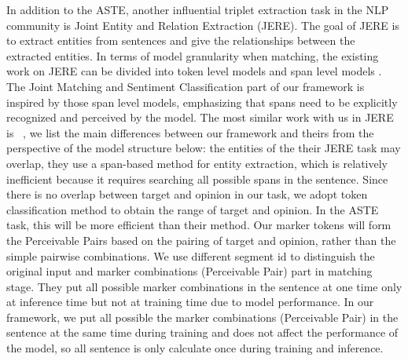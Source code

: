 \documentclass[11pt]{article}
\begin{document}
In addition to the ASTE, another influential triplet extraction task in the NLP community is Joint Entity and Relation Extraction (JERE). The goal of JERE is to extract entities from sentences and give the relationships between the extracted entities. In terms of model granularity when matching, the existing work on JERE can be divided into token level models \cite{zhang2017end,zheng2017joint} and span level models  \cite{wadden2019entity,zhong2020frustratingly}. 
The Joint Matching and Sentiment Classification part of our framework is inspired by those span level models, emphasizing that spans need to be explicitly recognized and perceived by the model. 
The most similar work with us in JERE is ~\citet{zhong2020frustratingly}, we list the main differences between our framework and theirs from the perspective of the model structure below: {} the entities of the their JERE task may overlap, they use a span-based method for entity extraction, which is relatively inefficient because it requires searching all possible spans in the sentence. Since there is no overlap between target and opinion in our task,  we adopt token classification method to obtain the range of target and opinion. In the ASTE task, this will be more efficient than their method.
{} Our marker tokens will form the Perceivable Pairs based on the pairing of target and opinion, rather than the simple pairwise combinations.
{} We use different segment id to distinguish the original input and marker combinations (Perceivable Pair) part in matching stage. 
{} They put all possible marker combinations in the sentence at one time only at inference time but not at training time due to model performance. In our framework, we put all possible the marker combinations (Perceivable Pair) in the sentence at the same time during training and does not affect the performance of the model, so all sentence is only calculate once during training and inference.
\end{document}

